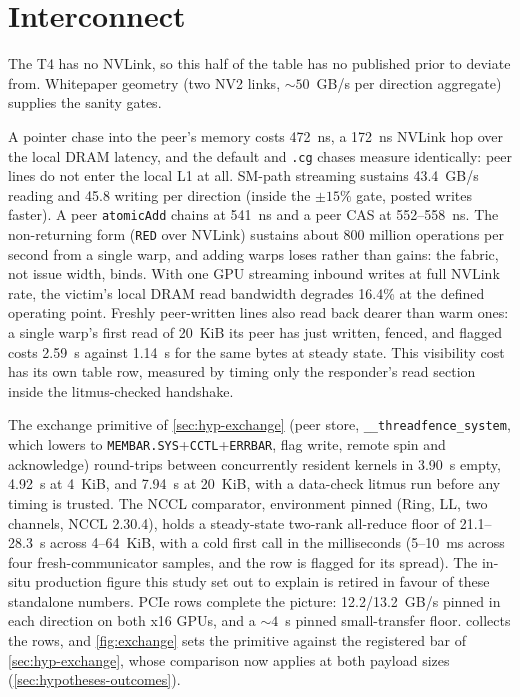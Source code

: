 \section{Interconnect}
\label{sec:interconnect}

The T4 has no NVLink, so this half of the table has no published prior to
deviate from. Whitepaper geometry (two NV2 links, ${\sim}50$~GB/s per
direction aggregate) supplies the sanity gates.

A pointer chase into the peer's memory costs 472~ns, a 172~ns NVLink
hop over the local DRAM latency, and the default and \texttt{.cg}
chases measure identically: peer lines do not enter the local L1 at all.
SM-path streaming sustains 43.4~GB/s reading and 45.8 writing per
direction (inside the $\pm15\%$ gate, posted writes faster). A peer
\texttt{atomicAdd} chains at 541~ns and a peer CAS at 552--558~ns. The
non-returning form (\texttt{RED} over NVLink) sustains about 800
million operations per second from a single warp, and adding warps
loses rather than gains: the fabric, not issue width, binds. With one
GPU streaming inbound
writes at full NVLink rate, the victim's local DRAM read bandwidth
degrades 16.4\% at the defined operating point. Freshly peer-written
lines also read back dearer than warm ones: a single warp's first read
of 20~KiB its peer has just written, fenced, and flagged costs
2.59~\textmu s against 1.14~\textmu s for the same bytes at steady
state. This
visibility cost has its own table row, measured by timing only the
responder's read section inside the litmus-checked handshake.

The exchange primitive of \cref{sec:hyp-exchange} (peer store,
\texttt{\_\_threadfence\_system}, which lowers to
\texttt{MEMBAR.SYS}+\texttt{CCTL}+\texttt{ERRBAR}, flag write, remote
spin and acknowledge) round-trips between concurrently resident
kernels in 3.90~\textmu s empty, 4.92~\textmu s at 4~KiB, and
7.94~\textmu s at 20~KiB, with
a data-check litmus run before any timing is trusted. The NCCL
comparator, environment pinned (Ring, LL, two channels, NCCL 2.30.4),
holds a steady-state two-rank all-reduce floor of 21.1--28.3~\textmu s
across 4--64~KiB, with a cold first call in the milliseconds (5--10~ms
across four fresh-communicator samples, and the row is flagged for its
spread). The in-situ production figure this study set out to explain is
retired in favour of these standalone numbers. PCIe rows complete the
picture: 12.2/13.2~GB/s pinned in each direction on both x16 GPUs, and a
${\sim}4$~\textmu s pinned small-transfer floor. 
collects the rows, and \cref{fig:exchange} sets the primitive against the
registered bar of \cref{sec:hyp-exchange}, whose comparison now applies
at both payload sizes (\cref{sec:hypotheses-outcomes}).

